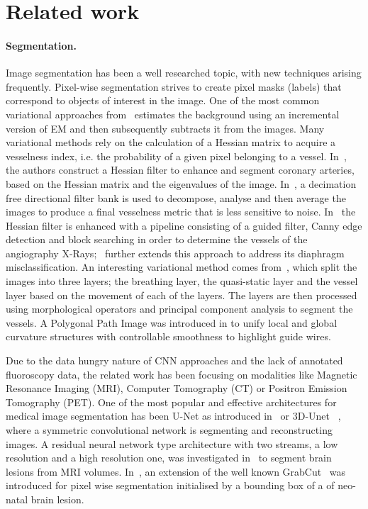 \documentclass{bmvc2k}
\begin{document}
	
	\section{Related work}
	\paragraph{Segmentation.} 
	Image segmentation has been a well researched topic, with new techniques arising frequently. Pixel-wise segmentation strives to create pixel masks (labels) that correspond to objects of interest in the image. One of the most common variational approaches from~\cite{Friedman2013} estimates  the background using an incremental version of EM and then subsequently subtracts it from the images. Many variational methods rely on the calculation of a Hessian matrix to acquire a vesselness index, i.e. the probability of a given pixel  belonging to a vessel. In~\cite{Hessian_segmentation},\cite{Felfelian2016} the authors construct a Hessian filter to enhance and segment coronary arteries, based on the Hessian matrix and the eigenvalues of the image. In~\cite{vessel_enh_directional_filter_bank},  a decimation free directional filter bank is used to decompose, analyse and then average the images to produce a final vesselness metric that is less sensitive to noise. In~\cite{vessel_detection_coronary} the Hessian filter is enhanced with a pipeline consisting of a guided filter, Canny edge detection and block searching in order to determine the vessels of the angiography X-Rays;~\cite{diaphragm_detection} further extends this approach to address its diaphragm misclassification. An interesting variational method comes from~\cite{layer_segmentation_vessels}, which split the images into three layers; the breathing layer, the quasi-static layer and the vessel layer based on the movement of each of the layers. The layers are then processed using morphological operators and principal component analysis to segment the vessels.    A Polygonal Path Image was introduced in \cite{Polygonal_path_image} to unify local and global curvature structures with controllable smoothness to highlight guide wires.
	
	Due to the data hungry nature of CNN approaches and the lack of annotated fluoroscopy data, the related work has been focusing on modalities like Magnetic Resonance Imaging (MRI), Computer Tomography (CT) or Positron Emission Tomography (PET). One of the most popular and effective architectures for medical image segmentation has been U-Net as introduced in~\cite{unet} or 3D-Unet ~\cite{arXiv:1606.06650}, where a symmetric convolutional network is segmenting and reconstructing  images. A residual neural network type architecture with two streams, a low resolution and a high resolution one, was investigated in~\cite{Kamnitsas16} to segment brain lesions from MRI volumes. In~\cite{Rajchl16}, an extension of the well known GrabCut~\cite{Rother04} was introduced  for pixel wise segmentation initialised by a bounding box of a of neo-natal brain lesion.
	
\end{document}
